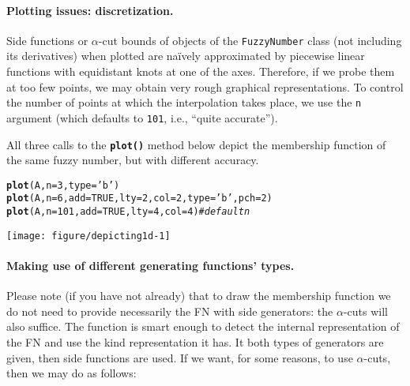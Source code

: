\documentclass[11pt]{article}\usepackage[]{graphicx}\usepackage[]{color}
\makeatletter
\newcommand{\hlnum}[1]{\textcolor[rgb]{0.686,0.059,0.569}{#1}}%
\newcommand{\hlstr}[1]{\textcolor[rgb]{0.192,0.494,0.8}{#1}}%
\newcommand{\hlcom}[1]{\textcolor[rgb]{0.678,0.584,0.686}{\textit{#1}}}%
\newcommand{\hlstd}[1]{\textcolor[rgb]{0.345,0.345,0.345}{#1}}%
\newcommand{\hlkwc}[1]{\textcolor[rgb]{0.333,0.667,0.333}{#1}}%
\newcommand{\hlkwd}[1]{\textcolor[rgb]{0.737,0.353,0.396}{\textbf{#1}}}%
\newenvironment{kframe}{%
 \def\at@end@of@kframe{}%
 \ifinner\ifhmode%
  \def\at@end@of@kframe{\end{minipage}}%
  \begin{minipage}{\columnwidth}%
 \fi\fi%
 \def\FrameCommand##1{\hskip\@totalleftmargin \hskip-\fboxsep
 \colorbox{shadecolor}{##1}\hskip-\fboxsep
     \hskip-\linewidth \hskip-\@totalleftmargin \hskip\columnwidth}%
 \MakeFramed {\advance\hsize-\width
   \@totalleftmargin\z@ \linewidth\hsize
   \@setminipage}}%
 {\par\unskip\endMakeFramed%
 \at@end@of@kframe}
\newenvironment{knitrout}{}{} %
\newcommand{\func}[1]{\texttt{\hlkwd{#1}}}
\newcommand{\argument}[1]{\texttt{\hlkwc{#1}}}
\makeatother
\begin{document}
\paragraph{Plotting issues: discretization.}
Side functions or $\alpha$-cut bounds of objects of the \texttt{FuzzyNumber}
class (not including its derivatives) when plotted are na\"{i}vely
approximated by piecewise linear functions with equidistant knots
at one of the axes. Therefore, if we probe them
at too few points, we may obtain very rough graphical representations.
To control the number of points at which the interpolation takes place,
we use the \argument{n} argument (which defaults to \texttt{101}, i.e., ``quite
accurate'').

All three calls to the \func{plot()} method below depict the membership
function of the same fuzzy number, but with different accuracy.

\begin{knitrout}\small
{}\color{fgcolor}\begin{kframe}
\begin{alltt}
\hlkwd{plot}\hlstd{(A,} \hlkwc{n}\hlstd{=}\hlnum{3}\hlstd{,} \hlkwc{type}\hlstd{=}\hlstr{'b'}\hlstd{)}
\hlkwd{plot}\hlstd{(A,} \hlkwc{n}\hlstd{=}\hlnum{6}\hlstd{,} \hlkwc{add}\hlstd{=}\hlnum{TRUE}\hlstd{,}  \hlkwc{lty}\hlstd{=}\hlnum{2}\hlstd{,} \hlkwc{col}\hlstd{=}\hlnum{2}\hlstd{,} \hlkwc{type}\hlstd{=}\hlstr{'b'}\hlstd{,} \hlkwc{pch}\hlstd{=}\hlnum{2}\hlstd{)}
\hlkwd{plot}\hlstd{(A,} \hlkwc{n}\hlstd{=}\hlnum{101}\hlstd{,} \hlkwc{add}\hlstd{=}\hlnum{TRUE}\hlstd{,} \hlkwc{lty}\hlstd{=}\hlnum{4}\hlstd{,} \hlkwc{col}\hlstd{=}\hlnum{4}\hlstd{)} \hlcom{# default n}
\end{alltt}
\end{kframe}
\end{knitrout}

\begin{center}
\begin{knitrout}\small
{}\color{fgcolor}

{\centering \texttt{[image: figure/depicting1d-1]} 

}



\end{knitrout}
\end{center}




\paragraph{Making use of different generating functions' types.}
Please note (if you have not already) that to draw the membership
function we do not need to provide necessarily the FN with side generators:
the $\alpha$-cuts will also suffice.
The function is smart enough to detect the internal
representation of the FN and use the kind representation it has.
It both types of generators are given, then side functions are used.
If we want, for some reasons, to use $\alpha$-cuts, then we may do as follows:
\end{document}
